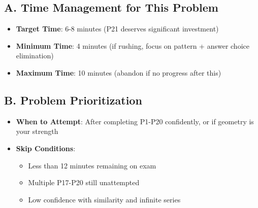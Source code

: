 \documentclass[]{article}
\begin{document}
\begin{competitionbox}
\subsection*{A. Time Management for This Problem}
\begin{itemize}[leftmargin=*]
    \item \textbf{Target Time}: 6-8 minutes (P21 deserves significant investment)
    \item \textbf{Minimum Time}: 4 minutes (if rushing, focus on pattern + answer choice elimination)
    \item \textbf{Maximum Time}: 10 minutes (abandon if no progress after this)
\end{itemize}

\subsection*{B. Problem Prioritization}
\begin{itemize}[leftmargin=*]
    \item \textbf{When to Attempt}: After completing P1-P20 confidently, or if geometry is your strength
    \item \textbf{Skip Conditions}:
    \begin{itemize}
        \item Less than 12 minutes remaining on exam
        \item Multiple P17-P20 still unattempted
        \item Low confidence with similarity and infinite series
    \end{itemize}
\end{itemize}


\end{competitionbox}
\end{document}
